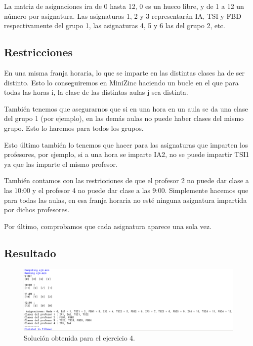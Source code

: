 \documentclass[11pt, spanish]{article}
\begin{document}
La matriz de asignaciones ira de 0 hasta 12, 0 es un hueco libre, y de 1 a 12 un número por asignatura. Las asignaturas 1, 2 y 3 representarán IA, TSI y FBD respectivamente del grupo 1, las asignaturas 4, 5 y 6 las del grupo 2, etc.

\subsection{Restricciones}

En una misma franja horaria, lo que se imparte en las distintas clases ha de ser distinto. Esto lo conseguiremos en MiniZinc haciendo un bucle en el que para todas las horas i, la clase de las distintas aulas j sea distinta.

También tenemos que asegurarnos que si en una hora en un aula se da una clase del grupo 1 (por ejemplo), en las demás aulas no puede haber clases del mismo grupo. Esto lo haremos para todos los grupos.

Esto último también lo tenemos que hacer para las asignaturas que imparten los profesores, por ejemplo, si a una hora se imparte IA2, no se puede impartir TSI1 ya que las imparte el mismo profesor.

También contamos con las restricciones de que el profesor 2 no puede dar clase a las 10:00 y el profesor 4 no puede dar clase a las 9:00. Simplemente hacemos que para todas las aulas, en esa franja horaria no esté ninguna asignatura impartida por dichos profesores.

Por último, comprobamos que cada asignatura aparece una sola vez.

\subsection{Resultado}


\begin{figure}[H]
  \centering
      \includegraphics[scale = 0.30]{sol4.png}
 		 \caption{Solución obtenida para el ejercicio 4.}
  		\label{fig:ej4}

\end{figure}
\end{document}
